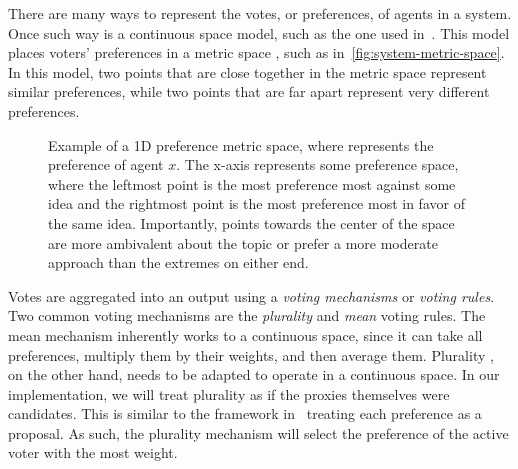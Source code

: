 There are many ways to represent the votes, or preferences, of agents in a system.
Once such way is a continuous space model, such as the one used in~\cite{Cohensius2017}.
This model places voters' preferences in a metric space \systemspace, such as
in~\autoref{fig:system-metric-space}.
In this model, two points that are close together in the metric space represent
similar preferences, while two points that are far apart represent very different
preferences.

\begin{figure}[htbp]
    \centering
    
    \caption{
        Example of a 1D preference metric space, where  represents the
        preference of agent $x$.
        The x-axis represents some preference space, where the leftmost point is
        the most preference most against some idea and the rightmost point is the most
        preference most in favor of the same idea.
        Importantly, points towards the center of the space are more ambivalent
          about
        the topic or prefer a more moderate approach than the extremes on either end.
    }
    \label{fig:system-metric-space}
\end{figure}

Votes are aggregated into an output using a \textit{voting mechanisms} or
\textit{voting rules}.
Two common voting mechanisms are the \textit{plurality} and \textit{mean} voting rules.
The mean mechanism inherently works to a continuous space, since it can take all
preferences, multiply them by their weights, and then average them.
Plurality  , on the other hand, needs to be
adapted to operate in a continuous space.
In our implementation, we will treat plurality as if the proxies themselves were
candidates.
This is similar to the framework in~\cite{Bulteau2021} treating each preference as a
proposal.
As such, the plurality mechanism will select the preference of the active voter with
the most weight.

